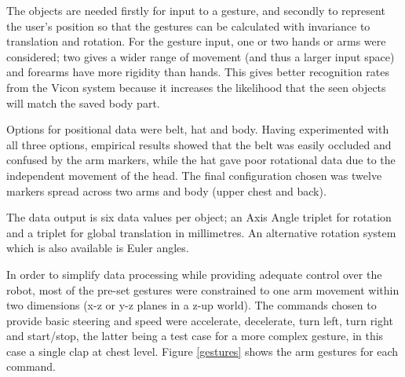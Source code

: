 \documentclass[12pt,a4,notitlepage]{report}
\renewcommand{\_}{\texttt{\symbol{95}}}
\newcommand{\<}{\texttt{\symbol{60}}}
\renewcommand{\>}{\texttt{\symbol{62}}}
\begin{document}
The objects are needed firstly for input to a gesture, and secondly to represent the user's position so that the gestures can be calculated with invariance to translation and rotation. For the gesture input, one or two hands or arms were considered; two gives a wider range of movement (and thus a larger input space) and forearms have more rigidity than hands. This gives better recognition rates from the Vicon system because it increases the likelihood that the seen objects will match the saved body part.

Options for positional data were belt, hat and body. Having experimented with all three options, empirical results showed that the belt was easily occluded and confused by the arm markers, while the hat gave poor rotational data due to the independent movement of the head. The final configuration chosen was twelve markers spread across two arms and body (upper chest and back).

The data output is six data values per object; an Axis Angle triplet for rotation and a triplet for global translation in millimetres. An alternative rotation system which is also available is Euler angles.

In order to simplify data processing while providing adequate control over the robot, most of the pre-set gestures were constrained to one arm movement within two dimensions (x-z or y-z planes in a z-up world). The commands chosen to provide basic steering and speed were accelerate, decelerate, turn left, turn right and start/stop, the latter being a test case for a more complex gesture, in this case a single clap at chest level. Figure \ref{gestures} shows the arm gestures for each command.
\end{document}
